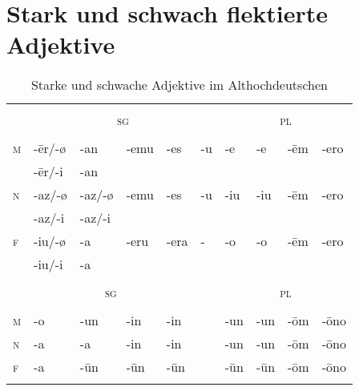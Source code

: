 \section{Stark und schwach flektierte Adjektive}


\begin{table}[H]
	\caption{Starke und schwache Adjektive im Althochdeutschen \citep[217-227]{Braune2004}}\label{table21}
	\begin{tabular}{>{\scshape}llllllllll}
		\lsptoprule
		\multicolumn{10}{c}{{stark}} \\
		& \multicolumn{5}{c}{\textsc{sg}} &  \multicolumn{4}{c}{\textsc{pl}} \\\cmidrule(lr){2-6}\cmidrule(lr){7-10}
		& \NOM & \AKK & \DAT & \GEN & \INSTR & \NOM & \AKK & \DAT & \GEN\\\midrule
		m & {}-\=er/-ø & {}-an & {}-emu & {}-es & {}-u & {}-e & {}-e & {}-\=em & {}-ero\\
		& {}-\=er/-i & {}-an &  &  &  &  &  &  & \\
		n & {}-az/-ø & {}-az/-ø & {}-emu & {}-es & {}-u & {}-iu & {}-iu & {}-\=em & {}-ero\\
		& {}-az/-i & {}-az/-i &  &  &  &  &  &  & \\
		f & {}-iu/-ø & {}-a & {}-eru & {}-era & - & {}-o & {}-o & {}-\=em & {}-ero\\
		& {}-iu/-i & {}-a &  &  &  &  &  &  & \\\midrule
		\multicolumn{10}{c}{{schwach}}  \\
		& \multicolumn{4}{c}{\textsc{sg}}&  & \multicolumn{4}{c}{\textsc{pl}} \\\cmidrule(lr){2-5}\cmidrule(lr){7-10}
		& \NOM & \AKK & \DAT & \GEN &  & \NOM & \AKK & \DAT & \GEN\\\midrule
		m & {}-o & {}-un & {}-in & {}-in &  & {}-un & {}-un & {}-\=om & {}-\=ono\\
		n & {}-a & {}-a & {}-in & {}-in &  & {}-un & {}-un & {}-\=om & {}-\=ono\\
		f & {}-a & {}-\=un & {}-\=un & {}-\=un &  & {}-\=un & {}-\=un & {}-\=om & {}-\=ono\\
		\lspbottomrule
	\end{tabular}
\end{table}


